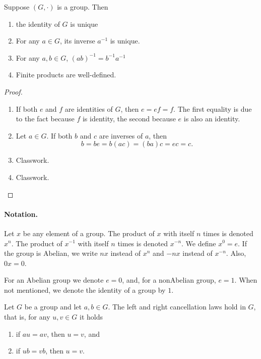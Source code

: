 \documentclass[11pt,a4paper]{article}
\begin{document}
\begin{prop}
    Suppose \((G, \cdot)\) is a group.
    Then 
    \begin{enumerate}[label=(\roman*)]
        \item the identity of \(G\) is unique
        \item For any \(a\in G\), its inverse \(a^{-1}\) is unique.
        \item For any \(a,b\in G\), \quad \((ab)^{-1} = b^{-1}a^{-1}\)
        \item Finite products are well-defined.
    \end{enumerate}
\end{prop}

\begin{proof}
\begin{enumerate}[label=(\roman*)]
    \item If both \(e\) and \(f\) are identities of \(G\), then \(e= ef = f\). The first equality is due to the fact because \(f\) is identity, the second because  \(e\) is also an identity.
    \item Let \(a\in G\). If both \(b\) and \(c\) are inverses of \(a\), then
        \[b = b e = b (ac) = (ba) c = e c = c. \]
    \item Classwork.
    \item Classwork.
\end{enumerate}
\end{proof}

\paragraph{Notation.} Let \(x\) be any element of a group. The product of \(x\) with itself \(n\) times is denoted \(x^{n}\).
The product of \(x^{-1}\) with itself \(n\) times is denoted \(x^{-n}\).
We define \(x^{0} = e\).
If the group is Abelian, we write \(nx\) instead of \(x^n\) and \(-nx\) instead of \(x^{ {-n}}\).
Also, \(0x = 0\).


\begin{rem}
    For an Abelian group we denote \(e= 0\), and, for a nonAbelian group, \(e=1.\)
    When not mentioned, we denote the identity of a group by \(1\).
\end{rem}


\begin{prop}
    Let $G$ be a group and let $a, b \in G$. The left and right cancellation laws hold in $G$, that is, for any \(u,v\in G\) it holds
    \begin{enumerate}[label=(\roman*)]
        \item if $a u=a v$, then $u=v$, and
        \item if $u b=v b$, then $u=v$.
    \end{enumerate}
\end{prop}
\end{document}
